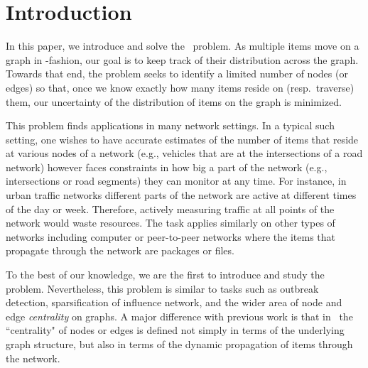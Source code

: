 \section{Introduction}
In this paper, we introduce and solve the 
 \mcproblem\ problem. 
As multiple items move on a graph in \markovchain-fashion, 
our goal is to keep track of their distribution 
across the graph.
Towards that end, the {\mcproblem} 
problem
seeks to identify a limited number of nodes (or edges)
so that, once we know exactly 
how many items reside on (resp.\ traverse) them, our uncertainty 
of the distribution of items on the graph
is minimized.

%


This problem finds applications in many network settings.
In a typical such setting, one wishes to have accurate estimates of
the number of items that reside at various
nodes of a network (e.g., vehicles that are at the intersections of a road network)
however faces constraints in how big a part of the network 
(e.g., intersections or road segments) they can monitor at any time.
For instance, in urban traffic networks 
different parts of the network are active at different 
times of the day or week. Therefore, actively measuring traffic 
at all points of the network would waste resources.
The task applies similarly on other types of networks including
computer or peer-to-peer networks where the items that propagate through the network are packages
or files.


To the best of our knowledge, we are the first to introduce and study the {\mcproblem} problem.
Nevertheless, this problem is similar
to tasks such as outbreak detection, 
sparsification of influence network, and the wider area
of node and edge {\it centrality} on graphs.
A major difference with previous work is that 
in \mcproblem\ the ``centrality" of nodes or edges
is defined not simply in terms of the
underlying graph structure, but also in terms of
the dynamic propagation of items through the network.


